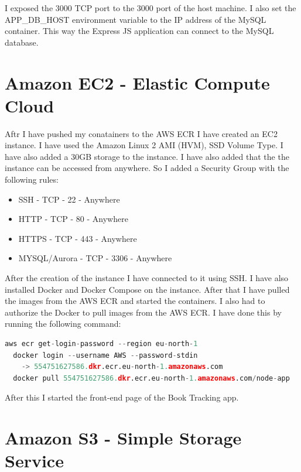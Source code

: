 \documentclass[11pt,a4paper,oneside]{report}
\begin{document}
I exposed the 3000 TCP port to the 3000 port of the host machine. I also set the APP\_DB\_HOST environment variable to the IP address of the MySQL container.
This way the Express JS application can connect to the MySQL database.

\section{Amazon EC2 - Elastic Compute Cloud}
Aftr I have pushed my conatainers to the AWS ECR I have created an EC2 instance. I have used the Amazon Linux 2 AMI (HVM), SSD Volume Type. I have also added a 30GB storage to the instance. I have also added that the the instance can be accessed from anywhere. So I added a Security Group with the following rules:
\begin{itemize}
  \item SSH - TCP - 22 - Anywhere
  \item HTTP - TCP - 80 - Anywhere
  \item HTTPS - TCP - 443 - Anywhere
  \item MYSQL/Aurora - TCP - 3306 - Anywhere
\end{itemize}

After the creation of the instance I have connected to it using SSH. I have also installed Docker and Docker Compose on the instance. After that I have pulled the images from the AWS ECR and started the containers. I also had to authorize the Docker to pull images from the AWS ECR. I have done this by running the following command:
\begin{lstlisting}[language=Python,basicstyle=\ttfamily\small,]
  aws ecr get-login-password --region eu-north-1 
  docker login --username AWS --password-stdin 
    -> 554751627586.dkr.ecr.eu-north-1.amazonaws.com
  docker pull 554751627586.dkr.ecr.eu-north-1.amazonaws.com/node-app
\end{lstlisting}

After this I started the front-end page of the Book Tracking app.

\section{Amazon S3 - Simple Storage Service}
\end{document}
